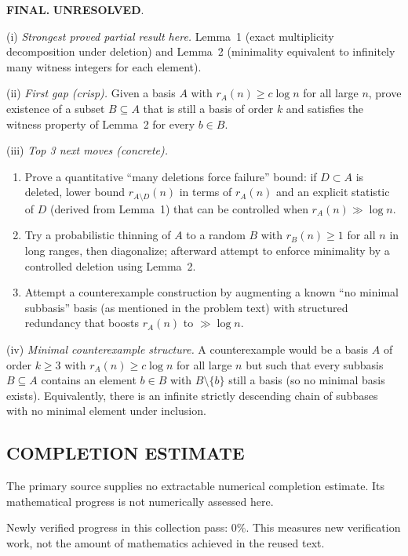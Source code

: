 \medskip
\noindent\textbf{FINAL.} \textbf{UNRESOLVED}.

\noindent(i) \emph{Strongest proved partial result here.}
Lemma~1 (exact multiplicity decomposition under deletion) and Lemma~2 (minimality equivalent to infinitely many witness integers for each element).

\noindent(ii) \emph{First gap (crisp).}
Given a basis $A$ with $r_A(n)\ge c\log n$ for all large $n$, prove existence of a subset $B\subseteq A$ that is still a basis of order $k$ and satisfies the witness property of Lemma~2 for every $b\in B$.

\noindent(iii) \emph{Top 3 next moves (concrete).}
\begin{enumerate}
\item Prove a quantitative ``many deletions force failure'' bound: if $D\subset A$ is deleted, lower bound $r_{A\setminus D}(n)$ in terms of $r_A(n)$ and an explicit statistic of $D$ (derived from Lemma~1) that can be controlled when $r_A(n)\gg\log n$.
\item Try a probabilistic thinning of $A$ to a random $B$ with $r_B(n)\ge 1$ for all $n$ in long ranges, then diagonalize; afterward attempt to enforce minimality by a controlled deletion using Lemma~2.
\item Attempt a counterexample construction by augmenting a known ``no minimal subbasis'' basis (as mentioned in the problem text) with structured redundancy that boosts $r_A(n)$ to $\gg\log n$.
\end{enumerate}

\noindent(iv) \emph{Minimal counterexample structure.}
A counterexample would be a basis $A$ of order $k\ge 3$ with $r_A(n)\ge c\log n$ for all large $n$ but such that every subbasis $B\subseteq A$ contains an element $b\in B$ with $B\setminus\{b\}$ still a basis (so no minimal basis exists). Equivalently, there is an infinite strictly descending chain of subbases with no minimal element under inclusion.




\subsection*{COMPLETION ESTIMATE}
The primary source supplies no extractable numerical completion estimate. Its mathematical progress is not numerically assessed here.

Newly verified progress in this collection pass: $0\%$. This measures new verification work, not the amount of mathematics achieved in the reused text.
